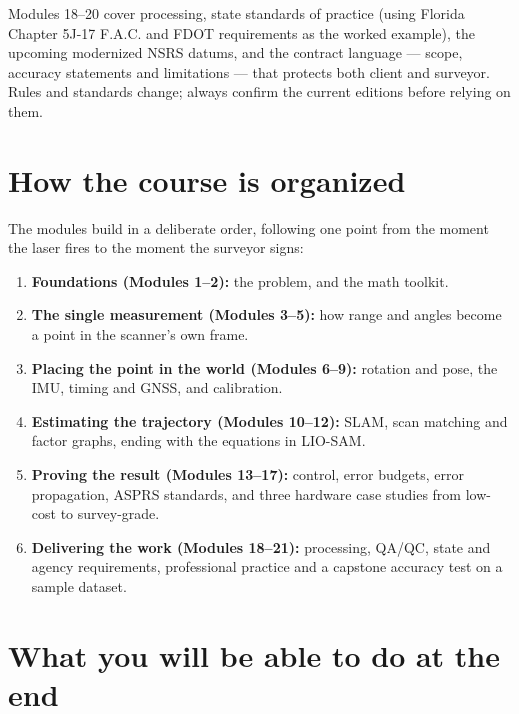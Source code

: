Modules 18--20 cover processing, state standards of practice (using Florida Chapter 5J-17 F.A.C. and FDOT requirements as the worked example), the upcoming modernized NSRS datums, and the contract language --- scope, accuracy statements and limitations --- that protects both client and surveyor. Rules and standards change; always confirm the current editions before relying on them.

\section{How the course is organized}

The modules build in a deliberate order, following one point from the moment the laser fires to the moment the surveyor signs:
\begin{enumerate}
\item \textbf{Foundations (Modules 1--2):} the problem, and the math toolkit.
\item \textbf{The single measurement (Modules 3--5):} how range and angles become a point in the scanner's own frame.
\item \textbf{Placing the point in the world (Modules 6--9):} rotation and pose, the IMU, timing and GNSS, and calibration.
\item \textbf{Estimating the trajectory (Modules 10--12):} SLAM, scan matching and factor graphs, ending with the equations in LIO-SAM.
\item \textbf{Proving the result (Modules 13--17):} control, error budgets, error propagation, ASPRS standards, and three hardware case studies from low-cost to survey-grade.
\item \textbf{Delivering the work (Modules 18--21):} processing, QA/QC, state and agency requirements, professional practice and a capstone accuracy test on a sample dataset.
\end{enumerate}

\section{What you will be able to do at the end}

